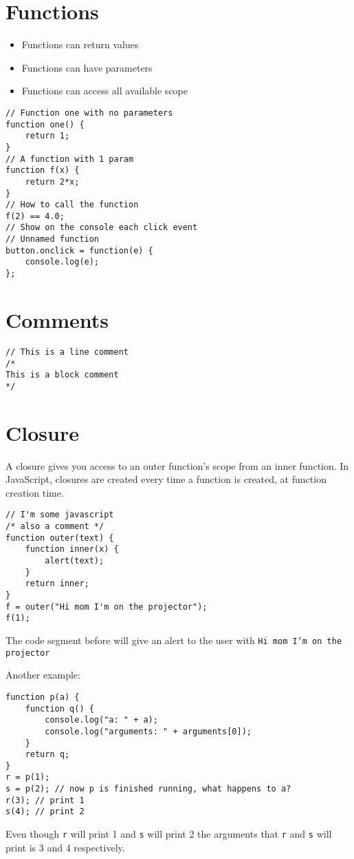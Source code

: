 \documentclass[../CMPUT-404-Notes.tex]{subfiles}
\begin{document}
\section{Functions}
\begin{itemize}
    \item Functions can return values
    \item Functions can have parameters
    \item Functions can access all available scope
\end{itemize}

\begin{verbatim}
// Function one with no parameters
function one() {
    return 1;
}
// A function with 1 param
function f(x) { 
    return 2*x; 
}
// How to call the function
f(2) == 4.0;
// Show on the console each click event
// Unnamed function
button.onclick = function(e) {
    console.log(e);
};
\end{verbatim}


\section{Comments}
\begin{verbatim}
// This is a line comment
/* 
This is a block comment
*/
\end{verbatim}

\section{Closure}
A closure gives you access to an outer function’s scope from an inner function. In JavaScript, closures are created every time a function is created, at function creation time.

\begin{verbatim}
// I'm some javascript
/* also a comment */
function outer(text) {
    function inner(x) {
        alert(text);
    }
    return inner;
}
f = outer("Hi mom I'm on the projector");
f(1);
\end{verbatim}

The code segment before will give an alert to the user with \texttt{Hi mom I'm on the projector}

Another example: 
\begin{verbatim}
function p(a) {
    function q() {
        console.log("a: " + a);
        console.log("arguments: " + arguments[0]);
    }
    return q;
}
r = p(1);
s = p(2); // now p is finished running, what happens to a?
r(3); // print 1
s(4); // print 2
\end{verbatim}
Even though \texttt{r} will print 1 and \texttt{s} will print 2 the arguments that \texttt{r} and \texttt{s} will print is 3 and 4 respectively. 
\end{document}
